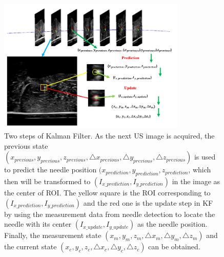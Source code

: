 \documentclass[journal,article,submit,moreauthors,pdftex]{Definitions/mdpi}
\begin{document}
\begin{figure}[H]
    \centering
    \includegraphics[width=0.8\textwidth]{figures/2/f4_g1.pdf}
    \captionsetup{width=16 cm,justification=centering}
    \caption{
            Two steps of Kalman Filter.
            As the next US image is acquired, the previous state ${(x_{previous},y_{previous},z_{previous},\triangle x_{previous},\triangle y_{previous},\triangle z_{previous})}$ is used to predict the needle position ${(x_{prediction},y_{prediction},z_{prediction}}$, which then will be transformed to ${(I_{x\_prediction},I_{y\_prediction})}$ in the image as the center of ROI.
            The yellow square is the ROI corresponding to ${(I_{x\_prediction},I_{y\_prediction})}$ and the red one is the update step in KF by using the measurement data from needle detection to locate the needle with its center ${(I_{x\_update},I_{y\_update})}$ as the needle position.
            Finally, the measurement state ${(x_{m},y_{m},z_{m}, \triangle x_{m},\triangle y_{m},\triangle z_{m})}$ and the current state ${(x_{c},y_{c},z_{c}, \triangle x_{c},\triangle y_{c},\triangle z_{c})}$ can be obtained.
            }
    \label{fig:4}
\end{figure}
\end{document}
